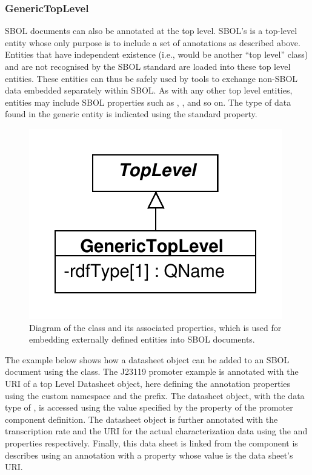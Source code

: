 \subsubsection{GenericTopLevel}  
\label{sec:GenericTopLevel}
SBOL documents can also be annotated at the top level. 
SBOL's  is a top-level entity whose only purpose is to include a set of annotations as described above. 
Entities that have independent existence (i.e., would be another ``top level'' class) and are not recognised by the SBOL standard are loaded into these top level entities. 
These  entities can thus be safely used by tools to exchange non-SBOL data embedded separately within SBOL.
As with any other top level entities,  entities may include SBOL properties such as , ,  and so on. The type of data found in the generic entity is indicated using the standard  property.

\begin{figure}[ht]
\begin{center}
\includegraphics[scale=0.6]{uml/generictoplevel}
\caption[]{Diagram of the  class and its associated properties, which is used for embedding externally defined entities into SBOL documents.}
\label{uml:generictoplevel}
\end{center}
\end{figure}

The example below shows how a datasheet object can be added to an SBOL document using the  class. 
The J23119 promoter example is annotated with the URI of a top Level Datasheet object, here defining the annotation properties using the custom  namespace and the  prefix. 
The datasheet object, with the data type of , is accessed using the  value specified by the  property of the promoter component definition. 
The datasheet object is further annotated with the transcription rate and the URI for the actual characterization data using the  and  properties respectively.
Finally, this data sheet is linked from the component is describes using an annotation with a  property whose value is the data sheet's URI.

